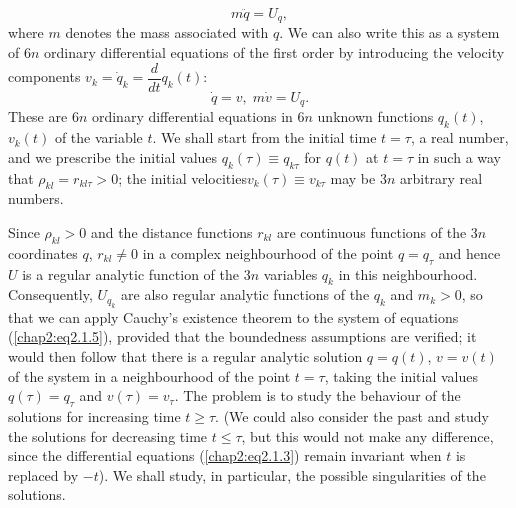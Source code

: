 \begin{equation*}
m \ddot{q} = U_q, \tag{2.1.4}\label{chap2:eq2.1.4} 
\end{equation*}
where $m$ denotes the mass associated with $q$. We can also write this as a system of $6n$ ordinary differential equations of the first order by introducing the velocity components $v_k = \dot{q}_k = \dfrac{d}{dt} q_k(t)$:
\begin{equation*}
\dot{q} = v, \; m\dot{v} = U_q. 
\tag{2.1.5}\label{chap2:eq2.1.5} 
\end{equation*}
These are $6n$ ordinary differential equations in $6n$ unknown functions $q_k(t)$, $v_k(t)$ of the variable $t$. We shall start from the initial time $t=\tau$, a real number, and we prescribe the initial values $q_k(\tau) \equiv q_{k\tau}$ for $q(t)$ at $t = \tau$ in such a way that $\rho_{kl} = r_{kl\tau} > 0$; the initial velocities\pageoriginale $v_k(\tau) \equiv v_{k\tau}$ may be $3n$ arbitrary real numbers.

Since $\rho_{kl} > 0$ and the distance functions $r_{kl}$ are continuous functions of the $3n$ coordinates $q$, $r_{kl} \neq 0$ in a complex neighbourhood of the point $q = q_\tau$ and hence $U$ is a regular analytic function of the $3n$ variables $q_k$ in this neighbourhood. Consequently, $U_{q_k}$ are also regular analytic functions of the $q_k$ and $m_k >0$, so that we can apply Cauchy's existence theorem to the system of equations (\ref{chap2:eq2.1.5}), provided that the boundedness assumptions are verified; it would then follow that there is a regular analytic solution $q = q(t)$, $v = v(t)$ of the system in a neighbourhood of the point $t = \tau$, taking the initial values $q(\tau) = q_\tau$ and $v(\tau) = v_{\tau}$. The problem is to study the behaviour of the solutions for increasing time $t \geq \tau$. (We could also consider the past and study the solutions for decreasing time $t \leq \tau$, but this would not make any difference, since the differential equations (\ref{chap2:eq2.1.3}) remain invariant when $t$ is replaced by $-t$). We shall study, in particular, the possible singularities of the solutions. 

